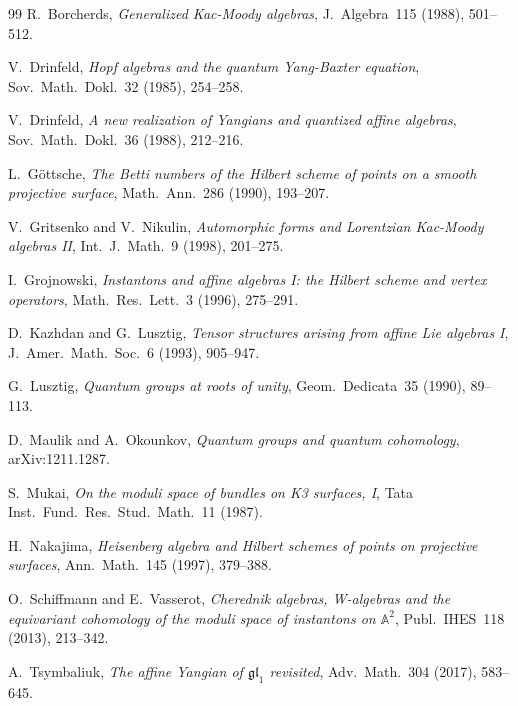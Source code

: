 \documentclass[11pt]{article}
\theoremstyle{definition}
\theoremstyle{remark}
\begin{document}

\begin{thebibliography}{99}
R.~Borcherds,
\emph{Generalized Kac-Moody algebras},
J.~Algebra~115 (1988), 501--512.

V.~Drinfeld,
\emph{Hopf algebras and the quantum Yang-Baxter equation},
Sov.~Math.~Dokl.~32 (1985), 254--258.

V.~Drinfeld,
\emph{A new realization of Yangians and quantized affine algebras},
Sov.~Math.~Dokl.~36 (1988), 212--216.

L.~G\"ottsche,
\emph{The Betti numbers of the Hilbert scheme of points on a smooth
projective surface},
Math.~Ann.~286 (1990), 193--207.

V.~Gritsenko and V.~Nikulin,
\emph{Automorphic forms and Lorentzian Kac-Moody algebras II},
Int.~J.~Math.~9 (1998), 201--275.

I.~Grojnowski,
\emph{Instantons and affine algebras I: the Hilbert scheme and vertex
operators},
Math.~Res.~Lett.~3 (1996), 275--291.

D.~Kazhdan and G.~Lusztig,
\emph{Tensor structures arising from affine Lie algebras I},
J.~Amer.~Math.~Soc.~6 (1993), 905--947.

G.~Lusztig,
\emph{Quantum groups at roots of unity},
Geom.~Dedicata~35 (1990), 89--113.

D.~Maulik and A.~Okounkov,
\emph{Quantum groups and quantum cohomology},
arXiv:1211.1287.

S.~Mukai,
\emph{On the moduli space of bundles on K3 surfaces, I},
Tata Inst.\ Fund.\ Res.\ Stud.~Math.~11 (1987).

H.~Nakajima,
\emph{Heisenberg algebra and Hilbert schemes of points on projective
surfaces},
Ann.~Math.~145 (1997), 379--388.

O.~Schiffmann and E.~Vasserot,
\emph{Cherednik algebras, W-algebras and the equivariant cohomology
of the moduli space of instantons on $\mathbb{A}^2$},
Publ.~IHES~118 (2013), 213--342.

A.~Tsymbaliuk,
\emph{The affine Yangian of $\mathfrak{gl}_1$ revisited},
Adv.~Math.~304 (2017), 583--645.
\end{thebibliography}
\end{document}
